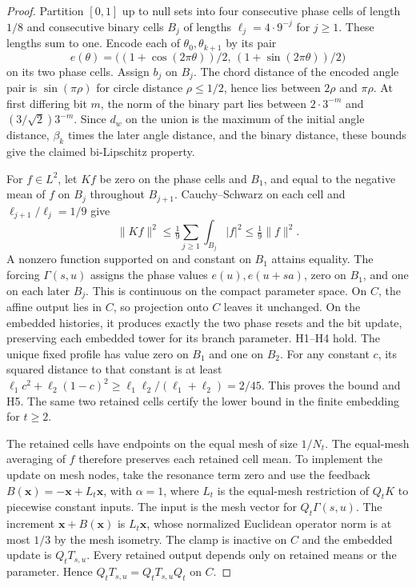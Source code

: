 \begin{proof}
Partition $[0,1]$ up to null sets into four consecutive phase cells of length $1/8$ and consecutive binary cells $B_j$ of lengths $\ell_j=4\cdot 9^{-j}$ for $j\geq1$. These lengths sum to one. Encode each of $\theta_0,\theta_{k+1}$ by its pair
\[
 e(\theta)=\bigl((1+\cos(2\pi\theta))/2,\,(1+\sin(2\pi\theta))/2\bigr)
\]
on its two phase cells. Assign $b_j$ on $B_j$. The chord distance of the encoded angle pair is $\sin(\pi\rho)$ for circle distance $\rho\leq1/2$, hence lies between $2\rho$ and $\pi\rho$. At first differing bit $m$, the norm of the binary part lies between $2\cdot3^{-m}$ and $(3/\sqrt{2})3^{-m}$. Since $d_w$ on the union is the maximum of the initial angle distance, $\beta_k$ times the later angle distance, and the binary distance, these bounds give the claimed bi-Lipschitz property.

For $f\in L^2$, let $Kf$ be zero on the phase cells and $B_1$, and equal to the negative mean of $f$ on $B_j$ throughout $B_{j+1}$. Cauchy--Schwarz on each cell and $\ell_{j+1}/\ell_j=1/9$ give
\[
 \|Kf\|^2\leq\tfrac19\sum_{j\geq1}\int_{B_j}|f|^2\leq\tfrac19\|f\|^2.
\]
A nonzero function supported on and constant on $B_1$ attains equality. The forcing $\Gamma(s,u)$ assigns the phase values $e(u),e(u+sa)$, zero on $B_1$, and one on each later $B_j$. This is continuous on the compact parameter space. On $C$, the affine output lies in $C$, so projection onto $C$ leaves it unchanged. On the embedded histories, it produces exactly the two phase resets and the bit update, preserving each embedded tower for its branch parameter. H1--H4 hold. The unique fixed profile has value zero on $B_1$ and one on $B_2$. For any constant $c$, its squared distance to that constant is at least $\ell_1c^2+\ell_2(1-c)^2\geq\ell_1\ell_2/(\ell_1+\ell_2)=2/45$. This proves the bound and H5. The same two retained cells certify the lower bound in the finite embedding for $t\geq2$.

The retained cells have endpoints on the equal mesh of size $1/N_t$. The equal-mesh averaging of $f$ therefore preserves each retained cell mean. To implement the update on mesh nodes, take the resonance term zero and use the feedback $B(\mathbf x)=-\mathbf x+L_t\mathbf x$, with $\alpha=1$, where $L_t$ is the equal-mesh restriction of $Q_tK$ to piecewise constant inputs. The input is the mesh vector for $Q_t\Gamma(s,u)$. The increment $\mathbf x+B(\mathbf x)$ is $L_t\mathbf x$, whose normalized Euclidean operator norm is at most $1/3$ by the mesh isometry. The clamp is inactive on $C$ and the embedded update is $Q_tT_{s,u}$. Every retained output depends only on retained means or the parameter. Hence $Q_tT_{s,u}=Q_tT_{s,u}Q_t$ on $C$.


\end{proof}
